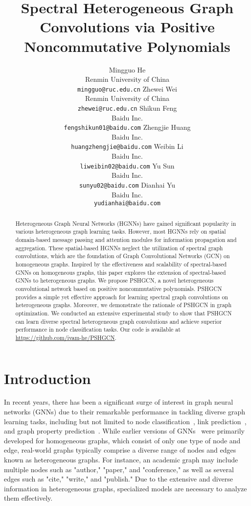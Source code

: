 \documentclass{article}
\title{Spectral Heterogeneous Graph Convolutions via Positive Noncommutative Polynomials}
\author{Mingguo He \\
  Renmin University of China\\
  \texttt{mingguo@ruc.edu.cn}
  \And
  Zhewei Wei \\
  Renmin University of China\\
  \texttt{zhewei@ruc.edu.cn}
  \AND
  Shikun Feng \\
  Baidu Inc.\\
  \texttt{fengshikun01@baidu.com}
  \And
  Zhengjie Huang\\
  Baidu Inc.\\
  \texttt{huangzhengjie@baidu.com}
  \AND
  Weibin Li\\
  Baidu Inc.\\
  \texttt{liweibin02@baidu.com}
  \And
  Yu Sun\\
  Baidu Inc.\\
  \texttt{sunyu02@baidu.com}
  \And
  Dianhai Yu\\
  Baidu Inc.\\
  \texttt{yudianhai@baidu.com}
  \And  
}
\begin{document}
\maketitle

\begin{abstract}
Heterogeneous Graph Neural Networks (HGNNs) have gained significant popularity in various heterogeneous graph learning tasks. However, most HGNNs rely on spatial domain-based message passing and attention modules for information propagation and aggregation. These spatial-based HGNNs neglect the utilization of spectral graph convolutions, which are the foundation of Graph Convolutional Networks (GCN) on homogeneous graphs. Inspired by the effectiveness and scalability of spectral-based GNNs on homogeneous graphs, this paper explores the extension of spectral-based GNNs to heterogeneous graphs. We propose PSHGCN, a novel heterogeneous convolutional network based on positive noncommutative polynomials. PSHGCN 
provides a simple yet effective approach for learning spectral graph convolutions on heterogeneous graphs. Moreover, we demonstrate the rationale of PSHGCN in graph optimization. We conducted an extensive experimental study to show that PSHGCN can learn diverse spectral heterogeneous graph convolutions and achieve superior performance in node classification tasks. Our code is available at \url{https://github.com/ivam-he/PSHGCN}.
\end{abstract}

\section{Introduction}
In recent years, there has been a significant surge of interest in graph neural networks (GNNs) due to their remarkable performance in tackling diverse graph learning tasks, including but not limited to node classification~\cite{gcn,gat,Chebnet}, link prediction~\cite{zhang2018link,cai2021line,zhu2021neural}, and graph property prediction~\cite{gin,liu2019hyperbolic,hao2020asgn}. While earlier versions of GNNs~\cite{gcn,gat} were primarily developed for homogeneous graphs, which consist of only one type of node and edge, real-world graphs typically comprise a diverse range of nodes and edges known as heterogeneous graphs. For instance, an academic graph may include multiple nodes such as "author," "paper," and "conference," as well as several edges such as "cite," "write," and "publish." Due to the extensive and diverse information in heterogeneous graphs, specialized models are necessary to analyze them effectively.
\end{document}
